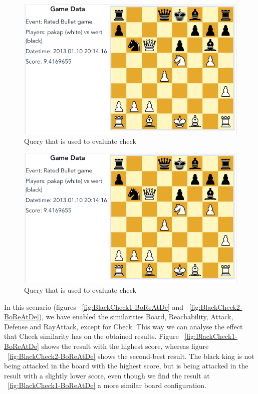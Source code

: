 \documentclass[11pt]{article}
\begin{document}
    \begin{figure}[H]
        \centering
        \includegraphics[width=14cm]{images/BlackCheck1-Bo}
        \caption{Query that is used to evaluate check}
        \label{fig:BlackCheck1-Bo}
    \end{figure}

    \begin{figure}[H]
        \centering
        \includegraphics[width=14cm]{images/BlackCheck1-Bo}
        \caption{Query that is used to evaluate check}
        \label{fig:BlackCheck2-Bo}
    \end{figure}

    In this scenario (figures ~\ref{fig:BlackCheck1-BoReAtDe} and ~\ref{fig:BlackCheck2-BoReAtDe}), we have enabled the similarities Board, Reachability, Attack, Defense and RayAttack, except for Check. This way we can analyse the effect that Check similarity has on the obtained results. Figure ~\ref{fig:BlackCheck1-BoReAtDe} shows the result with the highest score, whereas figure ~\ref{fig:BlackCheck2-BoReAtDe} shows the second-best result. The black king is not being attacked in the board with the highest score, but is being attacked in the result with a slightly lower score, even though we find the result at ~\ref{fig:BlackCheck1-BoReAtDe} a more similar board configuration.
\end{document}
